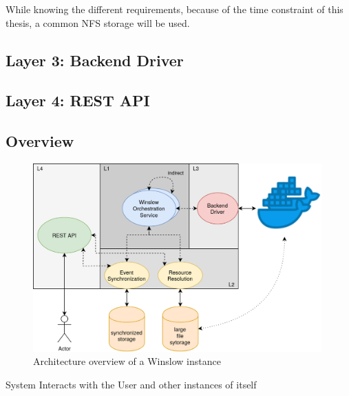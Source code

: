 While knowing the different requirements, because of the time constraint of this thesis, a common NFS storage will be used.

\subsection{Layer 3: Backend Driver}

\subsection{Layer 4: REST API}

\subsection{Overview}

\begin{figure}[H]
	\includegraphics[width=0.99\textwidth]{architecture_detailed.png}
	\centering
	\caption{Architecture overview of a Winslow instance}
	\label{architecture:detailed}
\end{figure}



System Interacts with the User and other instances of itself

